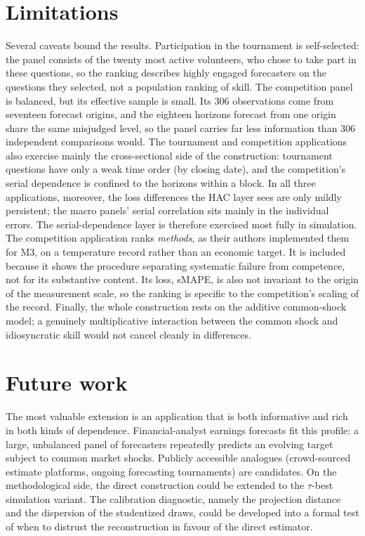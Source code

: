 \section{Limitations}
\label{sec:concl-limitations}

Several caveats bound the results. Participation in the tournament is self-selected: the
panel consists of the twenty most active volunteers, who chose to take part in these
questions, so the ranking describes highly engaged forecasters on the questions they
selected, not a population ranking of skill. The competition panel is balanced, but its
effective sample is small. Its 306 observations come from seventeen forecast origins,
and the eighteen horizons forecast from one origin share the same misjudged level, so the
panel carries far less information than 306 independent comparisons would. The
tournament and competition applications also exercise mainly the cross-sectional side of
the construction: tournament questions have only a weak time order (by closing date),
and the competition's serial dependence is confined to the horizons within a block. In
all three applications, moreover, the loss differences the HAC layer sees are only mildly
persistent; the macro panels' serial correlation sits mainly in the individual errors.
The serial-dependence layer is therefore exercised most fully in simulation. The
competition application ranks \emph{methods}, as their authors implemented them for M3,
on a temperature record rather than an economic target. It is included because it shows
the procedure separating systematic failure from competence, not for its substantive
content. Its loss, sMAPE, is also not invariant to the origin of the measurement scale,
so the ranking is specific to the competition's scaling of the record. Finally, the whole
construction rests on the additive common-shock model; a genuinely multiplicative
interaction between the common shock and idiosyncratic skill would not cancel cleanly in
differences.

\section{Future work}
\label{sec:concl-future}

The most valuable extension is an application that is both informative and rich in both
kinds of dependence. Financial-analyst earnings forecasts fit this profile: a large,
unbalanced panel of forecasters repeatedly predicts an evolving target subject to common
market shocks. Publicly accessible analogues (crowd-sourced estimate platforms, ongoing
forecasting tournaments) are candidates. On the methodological side, the direct
construction could be extended to the $\tau$-best simulation variant. The calibration
diagnostic, namely the projection distance and the dispersion of the studentized draws,
could be developed into a formal test of when to distrust the reconstruction in favour of
the direct estimator.
